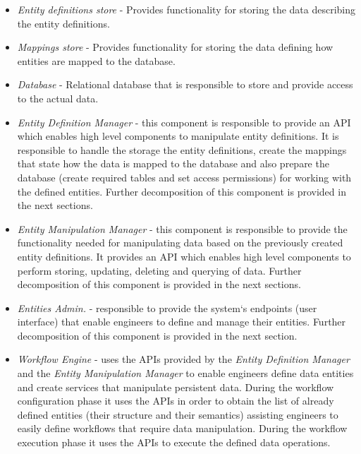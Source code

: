 \begin{itemize}
	
	\item \textit{Entity definitions store} - Provides functionality for storing the data describing the entity definitions. 
		
	\item \textit{Mappings store} - Provides functionality for storing the data defining how entities are mapped to the database.  
	
	\item \textit{Database} - Relational database that is responsible to store and provide access to the actual data.
	
	\item \textit{Entity Definition Manager} - this component is responsible to provide an API which enables high level components to manipulate entity definitions. It is responsible to handle the storage the entity definitions, create the mappings that state how the data is mapped to the database and also prepare the database (create required tables and set access permissions) for working with the defined entities. Further decomposition of this component is provided in the next sections.
		
	\item \textit{Entity Manipulation Manager} - this component is responsible to provide the functionality needed for manipulating data based on the previously created entity definitions. It provides an API which enables high level components to perform storing, updating, deleting and querying of data. Further decomposition of this component is provided in the next sections.
	
	\item \textit{Entities Admin.} - responsible to provide the system`s endpoints (user interface) that enable engineers to define and manage their entities. Further decomposition of this component is provided in the next section.

	\item \textit{Workflow Engine} - uses the APIs provided by the \textit{Entity Definition Manager} and the \textit{Entity Manipulation Manager} to enable engineers define data entities and create services that manipulate persistent data. During the workflow configuration phase it uses the APIs in order to obtain the list of already defined entities (their structure and their semantics) assisting engineers to easily define workflows that require data manipulation. During the workflow execution phase it uses the APIs to execute the defined data operations.
\end{itemize}

